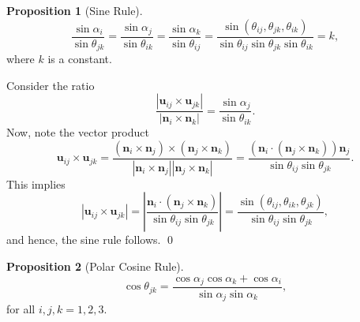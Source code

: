 \documentclass[fleqn,11pt,twoside]{article}
\makeatletter
\renewenvironment{proof}[1][\proofname]{\par
  \normalfont
  \topsep6\p@\@plus6\p@ \trivlist
  \item[\hskip\labelsep\textbf{%
    #1\@addpunct{.}}]\ignorespaces
}{%
  \qed\endtrivlist
}
\theoremstyle{definition}
\newtheorem{prop}{Proposition}
\makeatother
\begin{document}
\begin{prop}[Sine Rule]
\begin{equation}
\frac{\sin\alpha_i}{\sin\theta_{jk}}=
\frac{\sin\alpha_j}{\sin\theta_{ik}}=
\frac{\sin\alpha_k}{\sin\theta_{ij}}=
\frac{\sin(\theta_{ij},\theta_{jk},\theta_{ik})}{\sin\theta_{ij}\sin\theta_{jk}\sin\theta_{ik}}=k,
\end{equation}
where $k$ is a constant.
\end{prop}

\begin{proof}
Consider the ratio
\begin{equation}\label{ratio}
\frac{|\textbf{u}_{ij}\times\textbf{u}_{jk}|}{|\textbf{n}_i\times\textbf{n}_k|}=\frac{\sin\alpha_j}{\sin\theta_{ik}}.
\end{equation}
Now, note the vector product
\begin{equation}\label{eq:29}
\textbf{u}_{ij}\times\textbf{u}_{jk}=\frac{(\textbf{n}_i\times\textbf{n}_j)\times(\textbf{n}_j\times\textbf{n}_k)}{|\textbf{n}_i\times\textbf{n}_j||\textbf{n}_j\times\textbf{n}_k|}
=\frac{\left(\textbf{n}_i\cdot(\textbf{n}_j\times\textbf{n}_k)\right)\textbf{n}_j}{\sin\theta_{ij}\sin\theta_{jk}}.
\end{equation}
This implies
\begin{equation}
|\textbf{u}_{ij}\times\textbf{u}_{jk}|=\left|\frac{\textbf{n}_i\cdot(\textbf{n}_j\times\textbf{n}_k)}{\sin\theta_{ij}\sin\theta_{jk}}\right|
=\frac{\sin(\theta_{ij},\theta_{ik},\theta_{jk})}{\sin\theta_{ij}\sin\theta_{jk}},
\end{equation}
and hence, the sine rule follows.
\end{proof}

\begin{prop}[Polar Cosine Rule]
\begin{equation}
\cos\theta_{jk}=\frac{\cos\alpha_{j}\cos\alpha_{k}+\cos\alpha_{i}}{\sin\alpha_j\sin\alpha_k},
\end{equation}for all $i,j,k=1,2,3$.
\end{prop}
\end{document}
